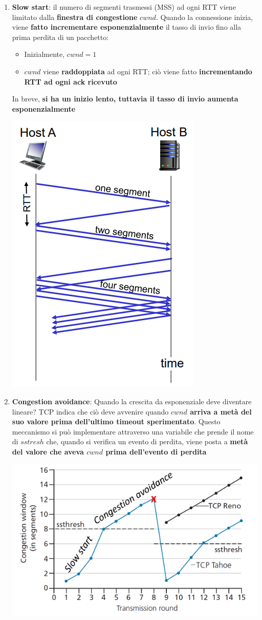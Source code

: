 \documentclass[12pt]{article}
\begin{document}
\begin{enumerate}
    \item \textbf{Slow start}: il numero di segmenti trasmessi (MSS) ad ogni RTT viene limitato dalla \textbf{finestra di congestione} $cwnd$.
    Quando la connessione inizia, viene \textbf{fatto incrementare esponenzialmente} il tasso di invio fino alla prima perdita di un pacchetto:
    \begin{itemize}
        \item Inizialmente, $cwnd = 1$
        \item $cwnd$ viene \textbf{raddoppiata} ad ogni RTT; ciò viene fatto \textbf{incrementando RTT ad ogni ack ricevuto}
    \end{itemize}
    In breve, \textbf{si ha un inizio lento, tuttavia il tasso di invio aumenta esponenzialmente}
    \begin{center}
        \includegraphics[width = 0.35\linewidth]{Images/70.png}
    \end{center}
    \item \textbf{Congestion avoidance}: Quando la crescita da esponenziale deve diventare lineare? TCP indica che ciò deve avvenire quando \textbf{$cwnd$ arriva a metà del suo valore prima dell'ultimo timeout sperimentato}. Questo meccanismo
    si può implementare attraverso una variabile che prende il nome di $sstresh$ che, quando si verifica un evento di perdita, viene posta a \textbf{metà del valore che aveva $cwnd$ prima dell'evento di perdita}
    \begin{center}
        \includegraphics[width = 0.65\linewidth]{Images/71.png}

\end{center}
\end{enumerate}
\end{document}
